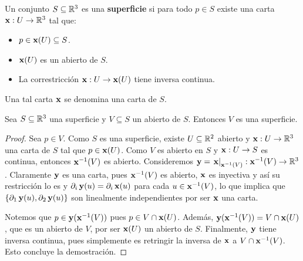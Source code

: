 \begin{defn}
Un conjunto $S\subseteq\RR^3$ es una \textbf{superficie} si para todo $p\in S$ existe una carta $\x:U\to\RR^3$ tal que:
\begin{itemize}
\item $p\in\x(U)\subseteq S$.
\item $\x(U)$ es un abierto de $S$.
\item La correstricción $\x:U\to\x(U)$ tiene inversa continua.
\end{itemize}
Una tal carta $\x$ se denomina una carta de $S$.
\end{defn}

\begin{prop}
Sea $S\subseteq\RR^3$ una superficie y $V\subseteq S$ un abierto de $S$. Entonces $V$ es una superficie.
\begin{proof}
Sea $p\in V$. Como $S$ es una superficie, existe $U\subseteq\RR^2$ abierto y $\x:U\to\RR^3$ una carta de $S$ tal que $p\in\x(U)$. Como $V$ es abierto en $S$ y $\x:U\to S$ es continua, entonces $\x^{-1}(V)$ es abierto. Consideremos $\y=\left.\x\right|_{\x^{-1}(V)}:\x^{-1}(V)\to\RR^3$. Claramente $\y$ es una carta, pues $\x^{-1}(V)$ es abierto, $\x$ es inyectiva y así su restricción lo es y $\partial_i\y(u)=\partial_i\x(u)$ para cada $u\in\x^{-1}(V)$, lo que implica que $\{\partial_1\y(u),\partial_2\y(u)\}$ son linealmente independientes por ser $\x$ una carta. 

Notemos que $p\in\y(\x^{-1}(V))$ pues $p\in V\cap\x(U)$. Además, $\y(\x^{-1}(V)) = V\cap\x(U)$, que es un abierto de $V$, por ser $\x(U)$ un abierto de $S$. Finalmente, $\y$ tiene inversa continua, pues simplemente es retringir la inversa de $\x$ a $V\cap\x^{-1}(V)$. Esto concluye la demostración.
\end{proof}
\end{prop}

